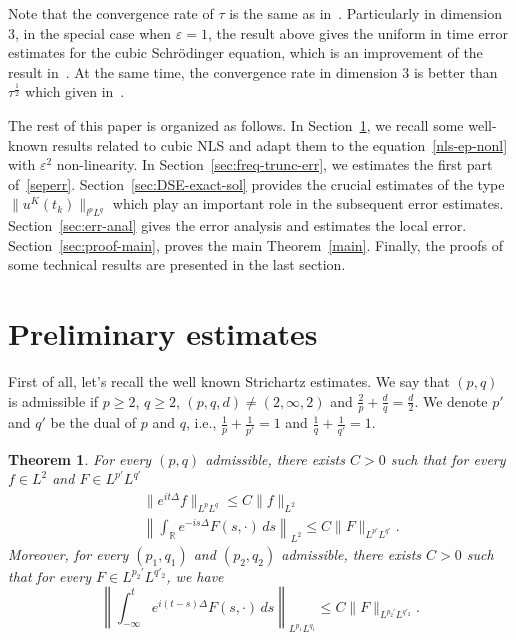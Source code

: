 \documentclass[10pt,a4paper]{article}
\newtheorem{theorem}{Theorem}[section]
\begin{document}
  Note that the convergence rate of \(\tau\) is the same as in~\cite{ORS21}. 
  Particularly in dimension \(3\), in the special case when \(\varepsilon=1\), the
  result above gives the uniform in time error estimates for the cubic
  Schr\"odinger equation, which is an improvement of the result in~\cite{ORS21}.
  At the same time, the convergence rate in dimension \(3\) is better than 
  \(\tau^\frac12\) which given in~\cite{CS22}.

  The rest of this paper is organized as follows. In
  Section~\ref{sec:pre-estim}, we recall some well-known results related to
  cubic NLS and adapt them to the equation~\eqref{nls-ep-nonl} with
  \(\varepsilon^2\) non-linearity. In Section~\ref{sec:freq-trunc-err}, we estimates 
  the first part of~\eqref{seperr}. Section~\ref{sec:DSE-exact-sol}
  provides the crucial estimates of the type \(\|u^K(t_k)\|_{l^p L^q}\) which play an
  important role in the subsequent error estimates. Section~\ref{sec:err-anal}
  gives the error analysis and estimates the local error. Section~\ref{sec:proof-main},
  proves the main Theorem~\ref{main}. Finally, the proofs of  some technical 
  results are presented in the last section.


  \section{Preliminary estimates}\label{sec:pre-estim}

  First of all, let's recall the well known Strichartz estimates. We say that 
  \( (p,q) \) is admissible if \(p \geq 2\), \(q \geq 2\), \((p,q,d) \neq (2,\infty,2)\)
  and \( \frac2p + \frac{d}q = \frac{d}2 \). We denote \(p'\)
  and \(q'\) be the dual of \(p\) and \(q\), i.e., \(\frac1p+\frac1{p'} = 1\) 
  and \(\frac1q+\frac1{q'} = 1\). 

  \begin{theorem}
    For every \((p,q)\) admissible, there exists \(C > 0\) such that for every 
    \( f \in L^2 \) and \( F \in L^{p'} L^{q'} \)
    \begin{eqnarray}
      \label{Tc} & & \|e^{it \Delta} f \|_{L^p{L^q}} \leq C \| f\|_{L^2} \\
      \label{T*c} & & \left \| \int_{\mathbb R} e^{-is \Delta } F(s,\cdot)\, ds\right\|_{L^2} 
      \leq C \|F \|_{L^{p'} L^{q'}}.
    \end{eqnarray}
    Moreover, for every \((p_1, q_1)\) and \((p_2, q_2)\) admissible, there exists
    \(C > 0\) such that for every \(F \in L^{p_2'} L^{q'_2}\), we have
    \begin{equation}\label{TT*c} 
      \left\| \int_{-\infty}^t e^{i ( t-s ) \Delta } F(s,\cdot) \, ds \right\|_{L^{p_{1}} L^{q_{1}}}
      \leq  C \|F \|_{L^{p_{2}'} L^{q'_{2}}}.
    \end{equation}
  \end{theorem}
\end{document}
